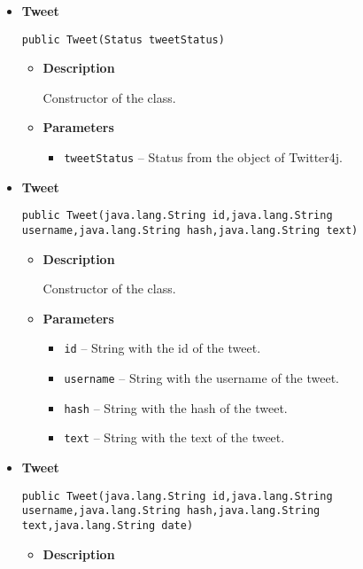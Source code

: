 {{{{{{{\begin{itemize}
{\begin{itemize}
{Default constructor of the class.
}
\end{itemize}
}%
\item{ 
\hypertarget{com.jmorenov.tweetsccore.twitter.Tweet(Status)}{{\bf  Tweet}\\}
\begin{lstlisting}[frame=none]
public Tweet(Status tweetStatus)\end{lstlisting} %
\begin{itemize}
\item{
{\bf  Description}

Constructor of the class.
}
\item{
{\bf  Parameters}
  \begin{itemize}
   \item{
\texttt{tweetStatus} -- Status from the object of Twitter4j.}
  \end{itemize}
}%
\end{itemize}
}%
\item{ 
\hypertarget{com.jmorenov.tweetsccore.twitter.Tweet(java.lang.String, java.lang.String, java.lang.String, java.lang.String)}{{\bf  Tweet}\\}
\begin{lstlisting}[frame=none]
public Tweet(java.lang.String id,java.lang.String username,java.lang.String hash,java.lang.String text)\end{lstlisting} %
\begin{itemize}
\item{
{\bf  Description}

Constructor of the class.
}
\item{
{\bf  Parameters}
  \begin{itemize}
   \item{
\texttt{id} -- String with the id of the tweet.}
   \item{
\texttt{username} -- String with the username of the tweet.}
   \item{
\texttt{hash} -- String with the hash of the tweet.}
   \item{
\texttt{text} -- String with the text of the tweet.}
  \end{itemize}
}%
\end{itemize}
}%
\item{ 
\hypertarget{com.jmorenov.tweetsccore.twitter.Tweet(java.lang.String, java.lang.String, java.lang.String, java.lang.String, java.lang.String)}{{\bf  Tweet}\\}
\begin{lstlisting}[frame=none]
public Tweet(java.lang.String id,java.lang.String username,java.lang.String hash,java.lang.String text,java.lang.String date)\end{lstlisting} %
\begin{itemize}
\item{
{\bf  Description}

}
\end{itemize}}
\end{itemize}}}}}}}}

